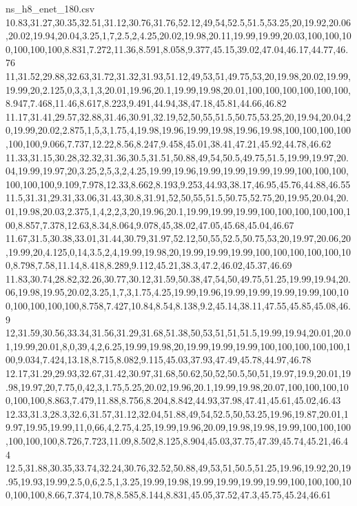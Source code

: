 \begin{filecontents*}[overwrite]{ns_h8_enet_180.csv}
10.83,31.27,30.35,32.51,31.12,30.76,31.76,52.12,49,54,52.5,51.5,53.25,20,19.92,20.06,20.02,19.94,20.04,3.25,1,7,2.5,2,4.25,20.02,19.98,20.11,19.99,19.99,20.03,100,100,100,100,100,100,8.831,7.272,11.36,8.591,8.058,9.377,45.15,39.02,47.04,46.17,44.77,46.76
11,31.52,29.88,32.63,31.72,31.32,31.93,51.12,49,53,51,49.75,53,20,19.98,20.02,19.99,19.99,20,2.125,0,3,3,1,3,20.01,19.96,20.1,19.99,19.98,20.01,100,100,100,100,100,100,8.947,7.468,11.46,8.617,8.223,9.491,44.94,38,47.18,45.81,44.66,46.82
11.17,31.41,29.57,32.88,31.46,30.91,32.19,52,50,55,51.5,50.75,53.25,20,19.94,20.04,20,19.99,20.02,2.875,1,5,3,1.75,4,19.98,19.96,19.99,19.98,19.96,19.98,100,100,100,100,100,100,9.066,7.737,12.22,8.56,8.247,9.458,45.01,38.41,47.21,45.92,44.78,46.62
11.33,31.15,30.28,32.32,31.36,30.5,31.51,50.88,49,54,50.5,49.75,51.5,19.99,19.97,20.04,19.99,19.97,20,3.25,2,5,3,2,4.25,19.99,19.96,19.99,19.99,19.99,19.99,100,100,100,100,100,100,9.109,7.978,12.33,8.662,8.193,9.253,44.93,38.17,46.95,45.76,44.88,46.55
11.5,31.31,29.31,33.06,31.43,30.8,31.91,52,50,55,51.5,50.75,52.75,20,19.95,20.04,20.01,19.98,20.03,2.375,1,4,2,2,3,20,19.96,20.1,19.99,19.99,19.99,100,100,100,100,100,100,8.857,7.378,12.63,8.34,8.064,9.078,45,38.02,47.05,45.68,45.04,46.67
11.67,31.5,30.38,33.01,31.44,30.79,31.97,52.12,50,55,52.5,50.75,53,20,19.97,20.06,20,19.99,20,4.125,0,14,3.5,2,4,19.99,19.98,20,19.99,19.99,19.99,100,100,100,100,100,100,8.798,7.58,11.14,8.418,8.289,9.112,45.21,38.3,47.2,46.02,45.37,46.69
11.83,30.74,28.82,32.26,30.77,30.12,31.59,50.38,47,54,50,49.75,51.25,19.99,19.94,20.06,19.98,19.95,20.02,3.25,1,7,3,1.75,4.25,19.99,19.96,19.99,19.99,19.99,19.99,100,100,100,100,100,100,8.758,7.427,10.84,8.54,8.138,9.2,45.14,38.11,47.55,45.85,45.08,46.9
12,31.59,30.56,33.34,31.56,31.29,31.68,51.38,50,53,51,51,51.5,19.99,19.94,20.01,20.01,19.99,20.01,8,0,39,4,2,6.25,19.99,19.98,20,19.99,19.99,19.99,100,100,100,100,100,100,9.034,7.424,13.18,8.715,8.082,9.115,45.03,37.93,47.49,45.78,44.97,46.78
12.17,31.29,29.93,32.67,31.42,30.97,31.68,50.62,50,52,50.5,50,51,19.97,19.9,20.01,19.98,19.97,20,7.75,0,42,3,1.75,5.25,20.02,19.96,20.1,19.99,19.98,20.07,100,100,100,100,100,100,8.863,7.479,11.88,8.756,8.204,8.842,44.93,37.98,47.41,45.61,45.02,46.43
12.33,31.3,28.3,32.6,31.57,31.12,32.04,51.88,49,54,52.5,50,53.25,19.96,19.87,20.01,19.97,19.95,19.99,11,0,66,4,2.75,4.25,19.99,19.96,20.09,19.98,19.98,19.99,100,100,100,100,100,100,8.726,7.723,11.09,8.502,8.125,8.904,45.03,37.75,47.39,45.74,45.21,46.44
12.5,31.88,30.35,33.74,32.24,30.76,32.52,50.88,49,53,51,50.5,51.25,19.96,19.92,20,19.95,19.93,19.99,2.5,0,6,2.5,1,3.25,19.99,19.98,19.99,19.99,19.99,19.99,100,100,100,100,100,100,8.66,7.374,10.78,8.585,8.144,8.831,45.05,37.52,47.3,45.75,45.24,46.61

\end{filecontents*}
